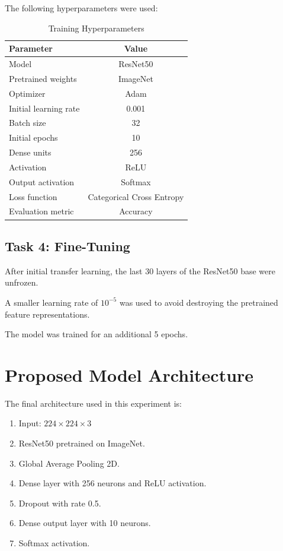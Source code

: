 \documentclass[12pt,a4paper]{article}
\begin{document}
The following hyperparameters were used:

\begin{table}[H]
\centering
\caption{Training Hyperparameters}
\begin{tabular}{lc}
\toprule
\textbf{Parameter} & \textbf{Value} \\
\midrule
Model & ResNet50 \\
Pretrained weights & ImageNet \\
Optimizer & Adam \\
Initial learning rate & 0.001 \\
Batch size & 32 \\
Initial epochs & 10 \\
Dense units & 256 \\
Activation & ReLU \\
Output activation & Softmax \\
Loss function & Categorical Cross Entropy \\
Evaluation metric & Accuracy \\
\bottomrule
\end{tabular}
\end{table}

\subsection{Task 4: Fine-Tuning}

After initial transfer learning, the last 30 layers of the ResNet50 base were unfrozen.

A smaller learning rate of $10^{-5}$ was used to avoid destroying the pretrained feature representations.

The model was trained for an additional 5 epochs.


\section{Proposed Model Architecture}

The final architecture used in this experiment is:

\begin{enumerate}
    \item Input: $224\times224\times3$
    \item ResNet50 pretrained on ImageNet.
    \item Global Average Pooling 2D.
    \item Dense layer with 256 neurons and ReLU activation.
    \item Dropout with rate 0.5.
    \item Dense output layer with 10 neurons.
    \item Softmax activation.
\end{enumerate}
\end{document}
